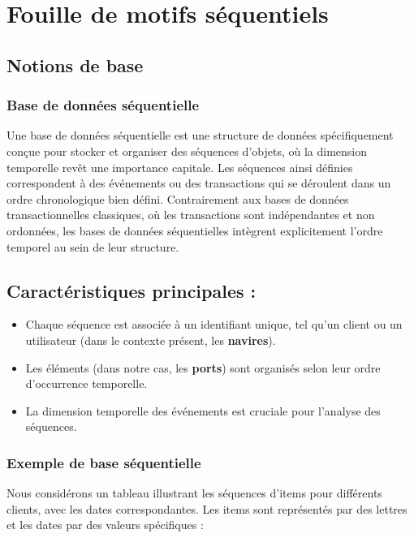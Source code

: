 \documentclass[a4paper,12pt]{article}
\begin{document}
\section{Fouille de motifs séquentiels}

\subsection{Notions de base}

\subsubsection{Base de données séquentielle}
Une base de données séquentielle est une structure de données spécifiquement conçue pour stocker et organiser des séquences d'objets, où la dimension temporelle revêt une importance capitale. Les séquences ainsi définies correspondent à des événements ou des transactions qui se déroulent dans un ordre chronologique bien défini. Contrairement aux bases de données transactionnelles classiques, où les transactions sont indépendantes et non ordonnées, les bases de données séquentielles intègrent explicitement l'ordre temporel au sein de leur structure.

\subsection*{Caractéristiques principales :}
\begin{itemize}
    \item Chaque séquence est associée à un identifiant unique, tel qu'un client ou un utilisateur (dans le contexte présent, les \textbf{navires}).
    \item Les éléments (dans notre cas, les \textbf{ports}) sont organisés selon leur ordre d'occurrence temporelle.
    \item La dimension temporelle des événements est cruciale pour l'analyse des séquences.
\end{itemize}

\subsubsection*{Exemple de base séquentielle}

Nous considérons un tableau illustrant les séquences d'items pour différents clients, avec les dates correspondantes. Les items sont représentés par des lettres et les dates par des valeurs spécifiques :
\end{document}
